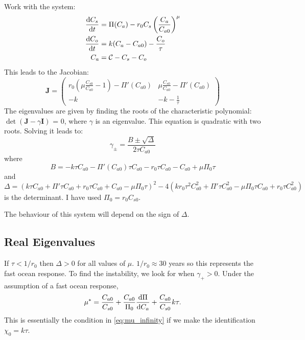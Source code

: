 Work with the system:
\begin{subequations}
  \label{eq:one_box_ocean}
  \begin{align}
    \dv{C_s}{t} &= \Pi(C_a) - r_0 C_s \left(\frac{C_a}{C_{a0}}\right)^{\mu} \\
    \dv{C_o}{t} &= k(C_a - C_{a0}) - \frac{C_o}{\tau} \\
    C_a &= \mathcal{C} - C_s - C_o
\end{align}
\end{subequations}
This leads to the Jacobian:
\begin{equation}
  \label{eq:jacobian_of_one_box}
    \bm{J} = 
    \begin{pmatrix}
    r_0 \left( \mu \frac{C_{s0}}{C_{a0}} - 1\right) - \Pi'(C_{a0}) & 
    \mu \frac{C_{s0}}{C_{a0}} - \Pi'(C_{a0}) \\
    -k & -k - \frac{1}{\tau}
    \end{pmatrix}
\end{equation}
The eigenvalues are given by finding the roots of the characteristic polynomial:
$\det(\bm{J} - \gamma \bm{I})$ = 0, where $\gamma$ is an eigenvalue. This equation is quadratic with 
two roots. Solving it leads to:
\begin{equation}
  \label{eq:eigenvalues_of_one_box_jac}
  \gamma_{\pm} = \frac{B \pm \sqrt{\Delta}}{2\tau C_{a0}}
\end{equation}
where
\begin{equation}
  \label{eq:B_in_one_box}
  B = -k \tau  C_{a0}-\Pi'(C_{a0}) \tau  C_{a0}-r_0 \tau  C_{a0}-C_{a0}+\mu  \Pi_0 \tau
\end{equation}
and
\begin{equation}
  \label{eq:discriminant_from_one_box}
  \Delta = \left(k \tau  C_{a0} +\Pi'\tau  C_{a0}+r_0 \tau  C_{a0}+C_{a0}-\mu  \Pi_0 \tau \right)^2-4 \left(k r_0 \tau ^2 C_{a0}^2+\Pi' \tau  C_{a0}^2-\mu  \Pi_0 \tau  C_{a0} +r_0 \tau  C_{a0}^2\right)
\end{equation}
is the determinant. I have used $\Pi_0 = r_0 C_{s0}$.

The behaviour of this system will depend on the sign of $\Delta$.

\subsection{Real Eigenvalues}
If $\tau < 1/r_0$ then $\Delta > 0$ for all values of $\mu$. $1/r_0 \approx 30$ years so this represents the fast ocean response.
To find the instability, we look for when $\gamma_+ > 0$. Under the assumption of a fast ocean response,
\begin{equation}
  \label{eq:instability_condition_one_box_fast}
  \mu^* = \frac{C_{a0}}{C_{s0}} + \frac{C_{a0}}{\Pi_0} \dv{\Pi}{C_a} + \frac{C_{a0}}{C_{s0}} k\tau.
\end{equation}
This is essentially the condition in \cref{eq:mu_infinity} if we make the identification $\chi_0 = k \tau$.
